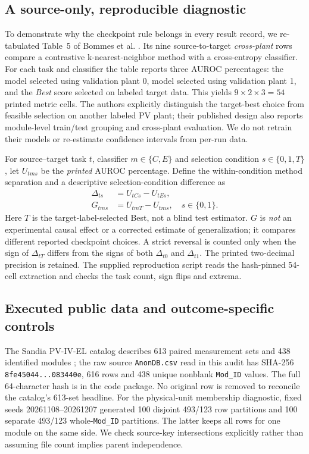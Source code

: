 \documentclass[10pt,a4paper]{article}
\begin{document}
\subsection{A source-only, reproducible diagnostic}
To demonstrate why the checkpoint rule belongs in every result record, we re-tabulated Table~5 of Bommes et al. \cite{bommes2022}. Its nine source-to-target \emph{cross-plant} rows compare a contrastive k-nearest-neighbor method with a cross-entropy classifier. For each task and classifier the table reports three AUROC percentages: the model selected using validation plant 0, model selected using validation plant 1, and the \emph{Best} score selected on labeled target data. This yields $9\times2\times3=54$ printed metric cells. The authors explicitly distinguish the target-best choice from feasible selection on another labeled PV plant; their published design also reports module-level train/test grouping and cross-plant evaluation. We do not retrain their models or re-estimate confidence intervals from per-run data.

For source--target task $t$, classifier $m\in\{C,E\}$ and selection condition $s\in\{0,1,T\}$, let $U_{tms}$ be the \emph{printed} AUROC percentage. Define the within-condition method separation and a descriptive selection-condition difference as
\begin{align}
\Delta_{ts}&=U_{tCs}-U_{tEs},\\
G_{tms}&=U_{tmT}-U_{tms},\quad s\in\{0,1\}.
\end{align}
Here $T$ is the target-label-selected Best, not a blind test estimator. $G$ is \emph{not} an experimental causal effect or a corrected estimate of generalization; it compares different reported checkpoint choices. A strict reversal is counted only when the sign of $\Delta_{tT}$ differs from the signs of both $\Delta_{t0}$ and $\Delta_{t1}$. The printed two-decimal precision is retained. The supplied reproduction script reads the hash-pinned 54-cell extraction and checks the task count, sign flips and extrema.

\subsection{Executed public data and outcome-specific controls}
The Sandia PV-IV-EL catalog describes 613 paired measurement sets and 438 identified modules \cite{sandia2025}; the raw source \texttt{AnonDB.csv} read in this audit has SHA-256 \texttt{8fe45044...083440e}, 616 rows and 438 unique nonblank \texttt{Mod\_ID} values. The full 64-character hash is in the code package. No original row is removed to reconcile the catalog's 613-set headline. For the physical-unit membership diagnostic, fixed seeds 20261108--20261207 generated 100 disjoint 493/123 row partitions and 100 separate 493/123 whole-\texttt{Mod\_ID} partitions. The latter keeps all rows for one module on the same side. We check source-key intersections explicitly rather than assuming file count implies parent independence.
\end{document}
